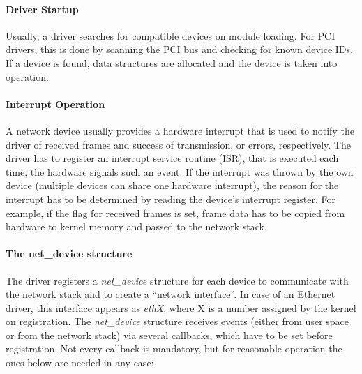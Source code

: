 \documentclass[a4paper,12pt,BCOR6mm,bibtotoc,idxtotoc]{scrbook}
\begin{document}
\paragraph{Driver Startup}

Usually, a driver searches for compatible devices on module loading.
For PCI drivers, this is done by scanning the PCI bus and checking for
known device IDs. If a device is found, data structures are allocated
and the device is taken into operation.

\paragraph{Interrupt Operation}

A network device usually provides a hardware interrupt that is used to
notify the driver of received frames and success of transmission, or
errors, respectively. The driver has to register an interrupt service
routine (ISR),
that is executed each time, the hardware signals such an event. If the
interrupt was thrown by the own device (multiple devices can share one
hardware interrupt), the reason for the interrupt has to be determined
by reading the device's interrupt register. For example, if the flag
for received frames is set, frame data has to be copied from hardware
to kernel memory and passed to the network stack.

\paragraph{The net\_device structure}

The driver registers a \textit{net\_device} structure for each device
to communicate with the network stack and to create a ``network
interface''. In case of an Ethernet driver, this interface appears as
\textit{ethX}, where X is a number assigned by the kernel on
registration. The \textit{net\_device} structure receives events
(either from user space or from the network stack) via several
callbacks, which have to be set before registration. Not every
callback is mandatory, but for reasonable operation the ones below are
needed in any case:
\end{document}
